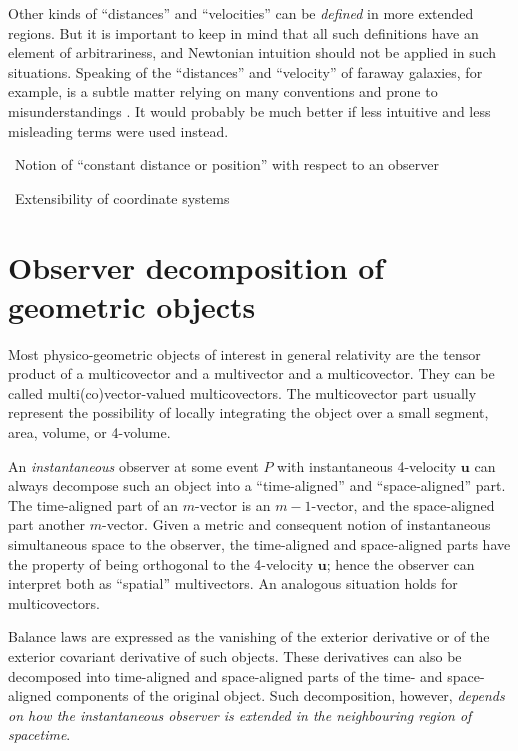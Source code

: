 \documentclass[\ifafour a4paper,12pt,\else a5paper,10pt,\fi%
onecolumn,oneside,article,%
british%
]{memoir}
\theoremstyle{remark}
\theoremstyle{innote}
\newcommand*{\pencil}{{\fontencoding{U}\fontfamily{fontawesometwo}\selectfont\symbol{210}}}
\newcommand{\mynotep}[1]{{\footnotesize\color{notecolour}\pencil\ #1}}
\renewcommand*{\|}[1][]{\nonscript\:#1\vert\nonscript\:\mathopen{}}
\newcommand*{\eg}{{e.g.}}
\newcommand*{\yu}{\bm{u}}
\begin{document}
Other kinds of \enquote{distances} and \enquote{velocities} can be \emph{defined} in more extended regions. But it is important to keep in mind that all such definitions have an element of arbitrariness, and Newtonian intuition should not be applied in such situations. Speaking of the \enquote{distances} and \enquote{velocity} of faraway galaxies, for example, is a subtle matter relying on many conventions and prone to misunderstandings \autocites[see \eg][]{davisetal2003,davisetal2004,groen2004,weber2004}. It would probably be much better if less intuitive and less misleading terms were used instead.


\mynotep{Notion of \enquote{constant distance or position} with respect to an observer}

\mynotep{Extensibility of coordinate systems}

\section{Observer decomposition of geometric objects}
\label{sec:obs_decomp}

Most physico-geometric objects of interest in general relativity are the tensor product of a multicovector and a multivector and a multicovector. They can be called multi(co)vector-valued multicovectors. The multicovector part usually represent the possibility of locally integrating the object over a small segment, area, volume, or 4-volume.

An \emph{instantaneous} observer at some event $P$ with instantaneous 4-velocity $\yu$ can always decompose such an object into a \enquote{time-aligned} and \enquote{space-aligned} part. The time-aligned part of an $m$-vector is an $m-1$-vector, and the space-aligned part another $m$-vector. Given a metric and consequent notion of instantaneous simultaneous space to the observer,  the time-aligned and space-aligned parts have the property of being orthogonal to the 4-velocity $\yu$; hence the observer can interpret both as \enquote{spatial} multivectors. An analogous situation holds for multicovectors.

Balance laws are expressed as the vanishing of the exterior derivative or of the exterior covariant derivative of such objects. These derivatives can also be decomposed into time-aligned and space-aligned parts of the time- and space-aligned components of the original object. Such decomposition, however, \emph{depends on how the instantaneous observer is extended in the neighbouring region of spacetime}.
\end{document}

